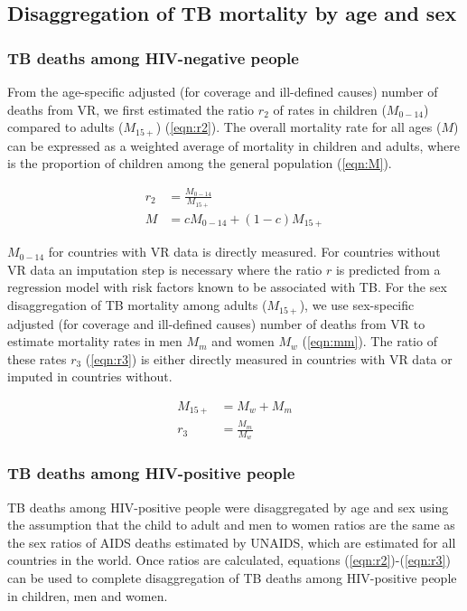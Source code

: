\subsection{Disaggregation of TB mortality by age and sex}

\subsubsection{TB deaths among HIV-negative people}

From the age-specific adjusted (for coverage and ill-defined causes) number of deaths from VR, we first estimated the ratio $r_2$ of rates in children ($M_{0-14}$) compared to adults ($M_{15+}$) (\ref{eqn:r2}). The overall mortality rate for all ages ($M$) can be expressed as a weighted average of mortality in children and adults, where  is the proportion of children among the general population (\ref{eqn:M}).

\begin{equation}
\begin{align}
r_2 &= \frac{M_{0-14}}{M_{15+}} \label{eqn:r2} \\
M &= c M_{0-14} + (1 - c) M_{15+} \label{eqn:M}
\end{align}
\end{equation}

$M_{0-14}$ for countries with VR data is directly measured. For countries without VR data an imputation step is necessary where the ratio $r$ is predicted from a regression model with risk factors known to be associated with TB. For the sex disaggregation of TB mortality among adults ($M_{15+}$), we use sex-specific adjusted (for coverage and ill-defined causes) number of deaths from VR to estimate mortality rates in men $M_m$  and women $M_w$ (\ref{eqn:mm}). The ratio of these rates $r_3$ (\ref{eqn:r3}) is either directly measured in countries with VR data or imputed in countries without.

\begin{equation}
\begin{align}
M_{15+} &= M_w + M_m \label{eqn:mm} \\
r_3 &= \frac{M_m}{M_w} \label{eqn:r3}
\end{align}
\end{equation}


\subsubsection{TB deaths among HIV-positive people}

TB deaths among HIV-positive people were disaggregated by age and sex using the assumption that the child to adult and men to women ratios are the same as the sex ratios of AIDS deaths estimated by UNAIDS, which are estimated for all countries in the world. Once ratios are calculated, equations (\ref{eqn:r2})-(\ref{eqn:r3}) can be used to complete disaggregation of TB deaths among HIV-positive people in children, men and women.
